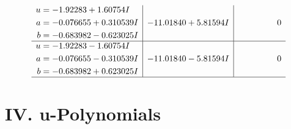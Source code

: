 \documentclass[1p]{elsarticle_modified}
\theoremstyle{definition}
\begin{document}
$$\begin{array}{c|c|c}
\begin{aligned}
u &= -1.92283 + 1.60754 I \\
a &= -0.076655 + 0.310539 I \\
b &= -0.683982 - 0.623025 I\end{aligned}
 & -11.01840 + 5.81594 I & \phantom{-0.000000 } 0 \\ \hline\begin{aligned}
u &= -1.92283 - 1.60754 I \\
a &= -0.076655 - 0.310539 I \\
b &= -0.683982 + 0.623025 I\end{aligned}
 & -11.01840 - 5.81594 I & \phantom{-0.000000 } 0\\
 \hline 
 \end{array}$$\newpage
\newpage\renewcommand{\arraystretch}{1}
\centering \section*{ IV. u-Polynomials}
\end{document}
